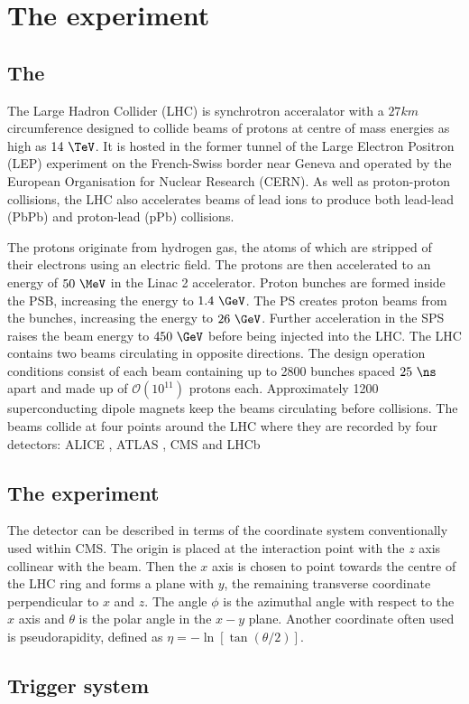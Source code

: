 \chapter{The \CMS experiment}
\label{chap:detector}

\section{The \LHC}
\label{sec:theLHC}

The Large Hadron Collider (LHC) \cite{Evans:2008zzb} is synchrotron acceralator
with a $27 km$ circumference designed to
collide beams of protons at centre of mass energies as high as $14~\TeV$. It is
hosted in the former tunnel of the Large Electron Positron (LEP) \cite{LEP:1983aa} experiment on the French-Swiss border
near Geneva and operated by the European Organisation for Nuclear Research
(CERN). As well as proton-proton collisions, the LHC also accelerates beams of
lead ions to produce both lead-lead (PbPb) and proton-lead (pPb) collisions.

The protons originate from hydrogen gas, the atoms of which are stripped of
their electrons using an electric field. The protons are then accelerated to an
energy of $50~\MeV$ in the Linac 2 accelerator. Proton bunches are formed inside
the \ac{PSB}, increasing the energy to $1.4~\GeV$. The \ac{PS} creates proton
beams from the bunches, increasing the energy to $26~\GeV$. Further acceleration
in the \ac{SPS} raises the beam energy to $450~\GeV$ before being injected into
the LHC. The LHC contains two beams circulating in opposite directions. The
design operation conditions consist of each beam containing up to 2800 bunches
spaced $25~\ns$ apart and made up of $\mathcal{O}(10^{11})$ protons each. 
Approximately 1200 superconducting dipole magnets keep the beams circulating
before collisions. The beams collide at four points around the LHC where they
are recorded by four detectors: ALICE \cite{Aamodt:2008zz}, ATLAS
\cite{Aad:2008zzm}, CMS \cite{Chatrchyan:2008aa} and LHCb \cite{Alves:2008zz}


\section{The \CMS experiment}
\label{sec:CMSInDetail}

The detector can be described in terms of the coordinate system conventionally used within CMS. The
origin is placed at the interaction point with the $z$ axis collinear with the
beam. Then the $x$ axis is chosen to point towards the centre of the LHC ring
and forms a plane with $y$, the remaining transverse coordinate perpendicular to
$x$ and $z$. The angle $\phi$ is the azimuthal angle with respect to the $x$
axis and $\theta$ is the polar angle in the $x-y$ plane. Another coordinate
often used is pseudorapidity, defined as $\eta = - \ln[\tan(\theta/2)]$. 


\section{Trigger system}
\label{sec:triggers}
